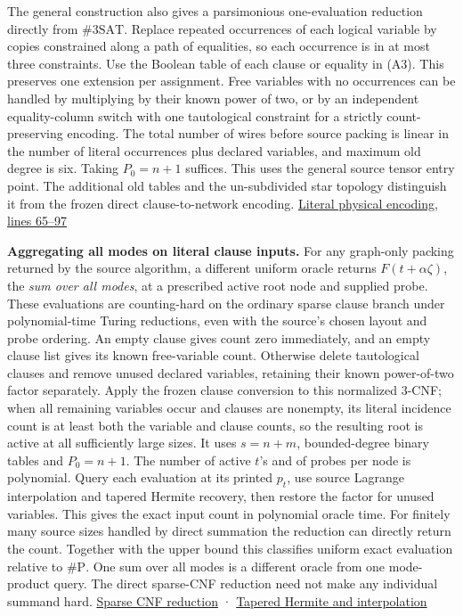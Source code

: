 \documentclass[11pt,a4paper]{article}
\begin{document}
The general construction also gives a parsimonious one-evaluation
reduction directly from \(\#3\mathrm{SAT}\). Replace repeated
occurrences of each logical variable by copies constrained along a path
of equalities, so each occurrence is in at most three constraints. Use
the Boolean table of each clause or equality in (A3). This preserves one
extension per assignment. Free variables with no occurrences can be
handled by multiplying by their known power of two, or by an independent
equality-column switch with one tautological constraint for a strictly
count-preserving encoding. The total number of wires before source
packing is linear in the number of literal occurrences plus declared
variables, and maximum old degree is six. Taking \(P_0=n+1\) suffices.
This uses the general source tensor entry point. The additional old
tables and the un-subdivided star topology distinguish it from the
frozen direct clause-to-network encoding.
\href{https://github.com/openai/math/blob/main/preprints/The-Exponential-Time-Hypothesis-is-False-October-25-2026/build/quantitative-reduction.tex\#L65}{Literal
physical encoding, lines 65--97}

\textbf{Aggregating all modes on literal clause inputs.} For any
graph-only packing returned by the source algorithm, a different uniform
oracle returns \(F(t+\alpha\zeta)\), the \emph{sum over all modes}, at a
prescribed active root node and supplied probe. These evaluations are
counting-hard on the ordinary sparse clause branch under polynomial-time
Turing reductions, even with the source's chosen layout and probe
ordering. An empty clause gives count zero immediately, and an empty
clause list gives its known free-variable count. Otherwise delete
tautological clauses and remove unused declared variables, retaining
their known power-of-two factor separately. Apply the frozen clause
conversion to this normalized 3-CNF; when all remaining variables occur
and clauses are nonempty, its literal incidence count is at least both
the variable and clause counts, so the resulting root is active at all
sufficiently large sizes. It uses \(s=n+m\), bounded-degree binary
tables and \(P_0=n+1\). The number of active \(t\)'s and of probes per
node is polynomial. Query each evaluation at its printed \(p_t\), use
source Lagrange interpolation and tapered Hermite recovery, then restore
the factor for unused variables. This gives the exact input count in
polynomial oracle time. For finitely many source sizes handled by direct
summation the reduction can directly return the count. Together with the
upper bound this classifies uniform exact evaluation relative to
\(\#\mathrm P\). One sum over all modes is a different oracle from one
mode-product query. The direct sparse-CNF reduction need not make any
individual summand hard.
\href{https://github.com/openai/math/blob/main/preprints/The-Exponential-Time-Hypothesis-is-False-October-25-2026/build/quantitative-reduction.tex\#L65}{Sparse
CNF reduction} ·
\href{https://github.com/openai/math/blob/main/preprints/The-Exponential-Time-Hypothesis-is-False-October-25-2026/build/quantitative-contraction.tex\#L250}{Tapered
Hermite and interpolation}
\end{document}
